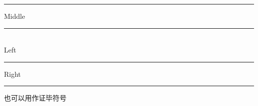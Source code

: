 \rule{1pt}{1em}Middle\rule{1pt}{1em} \\
Left\rule[0.5ex]{2cm}{0.6pt}Right \\
\rule[-0.1em]{1em}{1em} 也可以用作证毕符号
